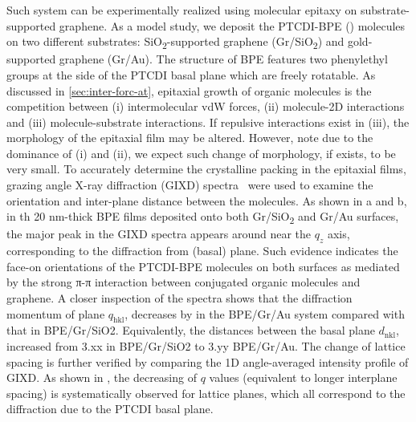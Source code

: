 Such system can be experimentally realized using molecular epitaxy on
substrate-supported graphene. As a model study, we deposit the
PTCDI-BPE () molecules on two different
substrates: SiO\textsubscript{2}-supported graphene
(Gr/SiO\textsubscript{2}) and gold-supported graphene (Gr/Au).
%
The structure of BPE features two phenyl\-ethyl  groups at the side of the PTCDI basal plane which are freely
rotatable.
%
As discussed in \autoref{sec:inter-forc-at}, epitaxial growth of
organic molecules is the competition between (i) intermolecular vdW
forces, (ii) molecule-2D interactions and (iii) molecule-substrate
interactions.
%
If repulsive interactions exist in (iii), the morphology of the
epitaxial film may be altered.  However, note due to the dominance of (i) and
(ii), we expect such change of morphology, if exists, to be very
small.
%
To accurately determine the crystalline packing in the epitaxial
films, grazing angle X-ray diffraction (GIXD) spectra~ were used to examine the orientation and inter-plane distance
between the molecules.
%
As shown in a and b, in th 20 nm-thick BPE
films deposited onto both Gr/SiO\textsubscript{2} and Gr/Au surfaces,
the major peak in the GIXD spectra appears around  near the $q_{z}$ axis, corresponding to the diffraction from
 (basal) plane. 
%
Such evidence indicates the face-on orientations of the PTCDI-BPE
molecules on both surfaces as mediated by the strong π-π interaction between conjugated organic molecules and graphene. 
%
A closer inspection of the spectra shows that the diffraction momentum
of  plane $q_{\mathrm{hkl}}$, decreases by  in the BPE/Gr/Au system compared with that in BPE/Gr/SiO2.
%
Equivalently, the distances between the basal plane
$d_{\mathrm{nkl}}$, increased from 3.xx\worktodo{\AA{}} in BPE/Gr/SiO2 to 3.yy\worktodo{\AA{}} BPE/Gr/Au. 
%
The change of lattice spacing is further verified by comparing the 1D
angle-averaged intensity profile of GIXD. As shown in , the decreasing of $q$ values (equivalent to longer inter\-plane
spacing) is systematically observed for 
lattice planes, which all correspond to the diffraction due to the
PTCDI basal plane.
%

